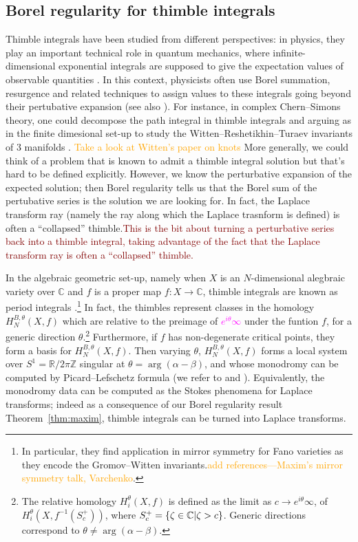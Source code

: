 \documentclass{article}
\let\Re\relax
\DeclareMathOperator{\Re}{Re}
\newcommand{\Z}{\mathbb{Z}}
\newcommand{\R}{\mathbb{R}}
\newcommand{\C}{\mathbb{C}}
\theoremstyle{definition}
\theoremstyle{plain}
\begin{document}
\subsection{Borel regularity for thimble integrals}
%
Thimble integrals have been studied from different perspectives: in physics, they play an important technical role in quantum mechanics, where infinite-dimensional exponential integrals are supposed to give the expectation values of observable quantities \cite{dunne-unsal2,dunne-unsal,Fauvet_Menous_Queva,Tanizaki:2014tua}. In this context, physicists often use Borel summation, resurgence and related techniques to assign values to these integrals going beyond their pertubative expansion (see also \cite{Berry_Howls,Berry1991,costin_kruskal,Howls97,Howls,pham1988resurgence}). For instance, in complex Chern--Simons theory, one could decompose the path integral in thimble integrals and arguing as in the finite dimesional set-up to study the Witten--Reshetikhin--Turaev invariants of $3$ manifolds \cite{gukov-marino-purtrov-resurgence,Witten}. \textcolor{orange}{Take a look at Witten's paper on knots} More generally, we could think of a problem that is known to admit a thimble integral solution but that's hard to be defined explicitly. However, we know the perturbative expansion of the expected solution; then Borel regularity tells us that the Borel sum of the pertubative series is the solution we are looking for. In fact, the Laplace transform ray (namely the ray along which the Laplace trasnform is defined) is often a ``collapsed'' thimble.\textcolor{Maroon}{This is the bit about turning a perturbative series back into a thimble integral, taking advantage of the fact that the Laplace transform ray is often a ``collapsed'' thimble.}

In the algebraic geometric set-up, namely when $X$ is an $N$-dimensional alegbraic variety over $\C$ and $f$ is a proper map $f\colon X\to\C$, thimble integrals are known as period integrals \cite{deligne2007singularites,Maxim_lectures,pham}.\footnote{In particular, they find application in mirror symmetry for Fano varieties as they encode the Gromov--Witten invariants.\textcolor{orange}{add references---Maxim's mirror symmetry talk, Varchenko}.} In fact, the thimbles represent classes in the homology $H^{B,\theta}_N(X,f)$ which are relative to the preimage of \textcolor{magenta}{$e^{i\theta}\infty$} under the funtion $f$, for a generic direction $\theta$.\footnote{The relative homology $H_i^{\theta}(X,f)$ is defined as the limit as $c\to e^{i\theta}\infty$, of $H_i^{\theta}(X,f^{-1}(S_c^+))$, where $S_c^+=\lbrace \zeta\in\C \vert \Re \zeta> c\rbrace$. Generic directions correspond to $\theta\neq \arg (\alpha-\beta)$. } Furthermore, if $f$ has non-degenerate critical points, they form a basis for $H_N^{B,\theta}(X,f)$. Then varying $\theta$, $H_N^{B,\theta}(X,f)$ forms a local system over $S^1=\R/2\pi \Z$ singular at $\theta=\arg(\alpha-\beta)$, and whose monodromy can be computed by Picard--Lefschetz formula (we refer to \cite[Section~1]{Arnold} and \cite[Section~3.3, Part II]{pham}). Equivalently, the monodromy data can be computed as the Stokes phenomena for Laplace transforms; indeed as a consequence of our Borel regularity result Theorem~\ref{thm:maxim}, thimble integrals can be turned into Laplace transforms.  
\end{document}
